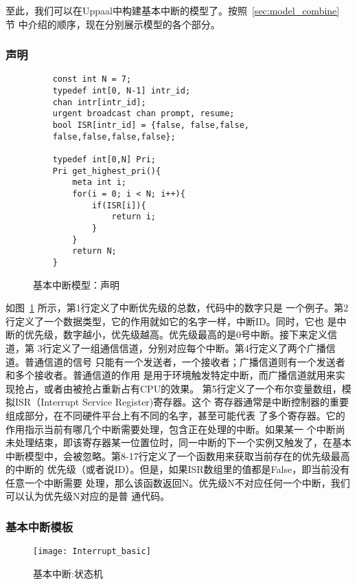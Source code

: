 至此，我们可以在Uppaal中构建基本中断的模型了。按照~\ref{sec:model_combine} 节
中介绍的顺序，现在分别展示模型的各个部分。

\subsubsection{声明}
\label{subsubsec:basic_decl}

\begin{figure}[H]
	\centering
	\begin{lstlisting}
	const int N = 7;
	typedef int[0, N-1] intr_id; 
	chan intr[intr_id];
	urgent broadcast chan prompt, resume;
	bool ISR[intr_id] = {false, false,false,
	false,false,false,false};
	
	typedef int[0,N] Pri;
	Pri get_highest_pri(){
		meta int i;
		for(i = 0; i < N; i++){
			if(ISR[i]){
				return i;
			} 
		}
		return N;
	}
	\end{lstlisting}
	\caption{基本中断模型：声明}
	\label{fig:basic_decl}
\end{figure}

如图~\ref{fig:basic_decl} 所示，第1行定义了中断优先级的总数，代码中的数字只是
一个例子。第2行定义了一个数据类型，它的作用就如它的名字一样，中断ID。同时，它也
是中断的优先级，数字越小，优先级越高。优先级最高的是0号中断。接下来定义信道，第
3行定义了一组通信信道，分别对应每个中断。第4行定义了两个广播信道。普通信道的信号
只能有一个发送者，一个接收者；广播信道则有一个发送者和多个接收者。普通信道的作用
是用于环境触发特定中断，而广播信道就用来实现抢占，或者由被抢占重新占有CPU的效果。
第5行定义了一个布尔变量数组，模拟ISR（Interrupt Service Register)寄存器。这个
寄存器通常是中断控制器的重要组成部分，在不同硬件平台上有不同的名字，甚至可能代表
了多个寄存器。它的作用指示当前有哪几个中断需要处理，包含正在处理的中断。如果某一
个中断尚未处理结束，即该寄存器某一位置位时，同一中断的下一个实例又触发了，在基本
中断模型中，会被忽略。第8-17行定义了一个函数用来获取当前存在的优先级最高的中断的
优先级（或者说ID）。但是，如果ISR数组里的值都是False，即当前没有任意一个中断需要
处理，那么该函数返回N。优先级N不对应任何一个中断，我们可以认为优先级N对应的是普
通代码。

\subsubsection{基本中断模板}
\label{subsubsec:basic_intr}

\begin{figure}[H]
	\centering
	\texttt{[image: Interrupt\_basic]}
	\caption{基本中断:状态机}
	\label{fig:interrupt_basic}
\end{figure}

